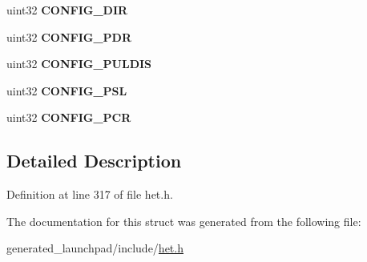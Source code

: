 \begin{DoxyCompactItemize}
uint32 {\bfseries C\+O\+N\+F\+I\+G\+\_\+\+D\+IR}
\item 
\mbox{\label{structhet__config__reg_af17713e62f47abaa5f01941308bec414}} 
uint32 {\bfseries C\+O\+N\+F\+I\+G\+\_\+\+P\+DR}
\item 
\mbox{\label{structhet__config__reg_ab9e994c620812ddb07216e242d011f1e}} 
uint32 {\bfseries C\+O\+N\+F\+I\+G\+\_\+\+P\+U\+L\+D\+IS}
\item 
\mbox{\label{structhet__config__reg_a30bcb0193ba4352851dd1b2dd0e53cb7}} 
uint32 {\bfseries C\+O\+N\+F\+I\+G\+\_\+\+P\+SL}
\item 
\mbox{\label{structhet__config__reg_ad27c41fd8a649e4be7c9f92f87bad083}} 
uint32 {\bfseries C\+O\+N\+F\+I\+G\+\_\+\+P\+CR}
\end{DoxyCompactItemize}


\subsection{Detailed Description}


Definition at line 317 of file het.\+h.



The documentation for this struct was generated from the following file\+:\begin{DoxyCompactItemize}
\item 
generated\+\_\+launchpad/include/\mbox{\hyperlink{het_8h}{het.\+h}}\end{DoxyCompactItemize}
